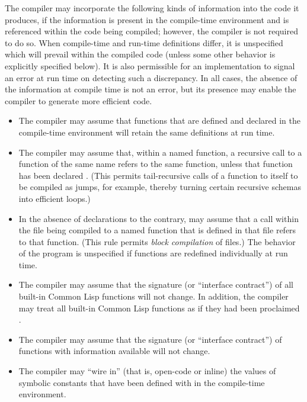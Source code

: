 The compiler may incorporate the following kinds of information
into the code it produces, if the information is present in the
compile-time environment and is referenced within the code being
compiled; however, the compiler is not required to do so.
When compile-time and run-time definitions differ, it is
unspecified which will prevail within the compiled code
(unless some other behavior is explicitly specified below).  It is also
permissible for an implementation to signal an error at run time on
detecting such a discrepancy.  In all cases, the absence of the
information at compile time is not an error, but its presence may
enable the compiler to generate more efficient code.
\begin{itemize}
\item The compiler may assume that functions that are defined and
	declared  in the compile-time environment will retain the
        same definitions at run time.

\item The compiler may assume that, within a named function, a
	recursive call to a function of the same name refers to the
	same function, unless that function has been declared .
(This permits tail-recursive calls of a function to itself
to be compiled as jumps, for example, thereby turning certain recursive
schemas into efficient loops.)

\item In the absence of 
	declarations to the contrary,
  may assume that a call within the file being compiled to a named
	function that is defined in that file refers to that function.
	(This rule permits \emph{block compilation} of files.)  The behavior of
	the program is unspecified if functions are redefined individually 
	at run time.

\item The compiler may assume that the signature (or ``interface contract'') of
	all built-in Common Lisp functions will not change.  In addition,
	the compiler may treat all built-in Common Lisp functions as if
	they had been proclaimed .

\item The compiler may assume that the signature (or ``interface contract'') of
	functions with  information available will not change.

\item The compiler may ``wire in'' (that is, open-code or inline)
the values of symbolic constants
	that have been defined with  in the compile-time
	environment.


\end{itemize}
